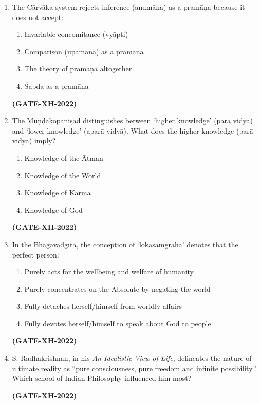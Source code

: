 \documentclass[journal]{IEEEtran}
\begin{document}
\begin{enumerate}
\item The Cārvāka system rejects inference (anumāna) as a pramāṇa because it does not accept:  
\begin{multicols}{2}
\begin{enumerate}
\item Invariable concomitance (vyāpti)  
\item Comparison (upamāna) as a pramāṇa  
\item The theory of pramāṇa altogether  
\item Śabda as a pramāṇa  
\end{enumerate}
\end{multicols}
\hfill\textbf{(GATE-XH-2022)}

\item The Muṇḍakopaniṣad distinguishes between ‘higher knowledge’ (parā vidyā) and ‘lower knowledge’ (aparā vidyā). What does the higher knowledge (parā vidyā) imply?  
\begin{multicols}{2}
\begin{enumerate}
\item Knowledge of the Ātman  
\item Knowledge of the World  
\item Knowledge of Karma  
\item Knowledge of God  
\end{enumerate}
\end{multicols}
\hfill\textbf{(GATE-XH-2022)}

\item In the Bhagavadgītā, the conception of ‘lokasamgraha’ denotes that the perfect person:  
\begin{enumerate}
\item Purely acts for the wellbeing and welfare of humanity  
\item Purely concentrates on the Absolute by negating the world  
\item Fully detaches herself/himself from worldly affairs  
\item Fully devotes herself/himself to speak about God to people  
\end{enumerate}
\hfill\textbf{(GATE-XH-2022)}

\item S. Radhakrishnan, in his \textit{An Idealistic View of Life}, delineates the nature of ultimate reality as “pure consciousness, pure freedom and infinite possibility.” Which school of Indian Philosophy influenced him most?  
\begin{enumerate}
\end{enumerate}
\hfill\textbf{(GATE-XH-2022)}


\end{enumerate}
\end{document}
